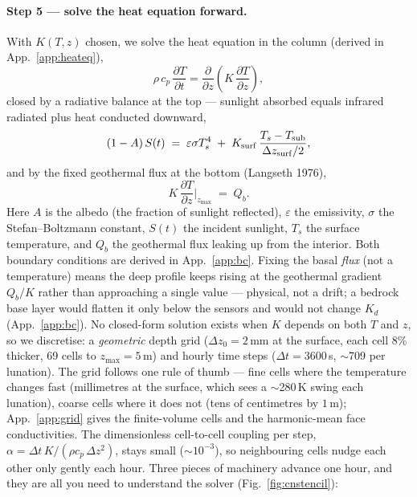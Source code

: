 \documentclass[11pt]{report}
\begin{document}
\paragraph{\textbf{Step 5 --- solve the heat equation forward.}}
With $K(T,z)$ chosen, we solve the heat equation in the column (derived in
App.~\ref{app:heateq}),
\begin{equation}
\rho\,c_p\,\frac{\partial T}{\partial t}
=\frac{\partial}{\partial z}\!\left(K\,\frac{\partial T}{\partial z}\right),
\label{eq:heat}
\end{equation}
closed by a radiative balance at the top --- sunlight absorbed equals infrared
radiated plus heat conducted downward,
\begin{equation}
(1-A)\,S(t) \;=\; \varepsilon\sigma T_s^4 \;+\; K_{\rm surf}\,\frac{T_s-T_{\rm sub}}{\Delta z_{\rm surf}/2},
\label{eq:surfbc}
\end{equation}
and by the fixed geothermal flux at the bottom (Langseth 1976),
\begin{equation}
K\,\frac{\partial T}{\partial z}\bigg|_{z_{\max}} \;=\; Q_b.
\label{eq:bottombc}
\end{equation}
Here $A$ is the albedo (the fraction of sunlight reflected), $\varepsilon$ the emissivity,
$\sigma$ the Stefan--Boltzmann constant, $S(t)$ the incident sunlight, $T_s$ the surface
temperature, and $Q_b$ the geothermal flux leaking up from the interior.
Both boundary conditions are derived in App.~\ref{app:bc}. Fixing the basal
\emph{flux} (not a temperature) means the deep profile keeps rising at the
geothermal gradient $Q_b/K$ rather than approaching a single value --- physical,
not a drift; a bedrock base layer would flatten it only below the sensors and
would not change $K_d$ (App.~\ref{app:bc}). No closed-form solution exists when
$K$ depends on both $T$ and $z$, so we discretise: a
\emph{geometric} depth grid ($\Delta z_0=2$\,mm at the surface, each cell 8\%
thicker, 69 cells to $z_{\max}=5$\,m) and hourly time steps ($\Delta t=3600$\,s,
$\sim$709 per lunation). The grid follows one rule of thumb --- fine cells where
the temperature changes fast (millimetres at the surface, which sees a
$\sim$280\,K swing each lunation), coarse cells where it does not (tens of
centimetres by $1$\,m); App.~\ref{app:grid} gives the finite-volume cells and the
harmonic-mean face conductivities. The dimensionless cell-to-cell coupling per step,
$\alpha=\Delta t\,K/(\rho c_p\,\Delta z^2)$, stays small ($\sim10^{-3}$), so
neighbouring cells nudge each other only gently each hour. Three pieces of
machinery advance one hour, and they are all you need to understand the solver
(Fig.~\ref{fig:cnstencil}):
\end{document}
